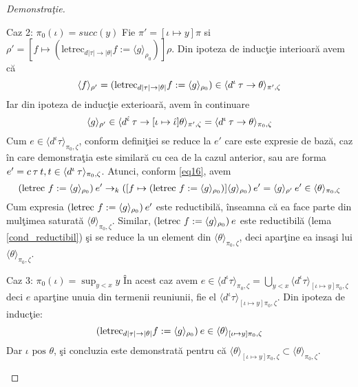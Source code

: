 \begin{proof}[Demonstra\c tie]
\begin{description}
\begin{description*}
    \item [Caz 2: $\pi_0(\iota)=succ(y)$] Fie $\pi' = [\iota \mapsto y]\pi $ si $\rho' = [f \mapsto (\text{letrec}_{d|\tau| \to |\theta|} f := \langle g \rangle_{\rho_0})] \rho$. Din ipoteza de induc\c tie interioar\u a avem c\u a
        \begin{equation}
            \langle f \rangle_{\rho'} = (\text{letrec}_{d|\tau| \to |\theta|} f := \langle g \rangle_{\rho_0}) \in \langle d^{\iota}\hspace{2pt} \tau \to \theta \rangle_{\pi',\zeta}
        \end{equation}
        Iar din ipoteza de induc\c tie exterioar\u a, avem \^ in continuare
        \begin{equation}\label{eq16}
        \langle g \rangle_{\rho'} \in \langle d^{\hat{\iota}}\hspace{2pt} \tau \to [\iota \mapsto \hat{\iota}]\theta \rangle_{\pi',\zeta} =
        \langle d^{{\iota}}\hspace{2pt} \tau \to \theta \rangle_{\pi_0,\zeta}
        \end{equation}
        Cum $e \in \langle d^{\iota} \tau \rangle_{\pi_0,\zeta}$, conform defini\c tiei se reduce la $e'$ care este expresie de baz\u a, caz \^ in care demonstra\c tia este similar\u a cu cea de la cazul anterior, sau are forma $e' = c\hspace{2pt} \tau\hspace{2pt} t , t \in \langle d^\iota\hspace{2pt} \tau \rangle_{\pi_0,\zeta}$. Atunci, conform \eqref{eq16}, avem
        $$
        (\text{letrec}\ f := \langle g \rangle_{\rho_0})\hspace{2pt} e' \to_k ([f \mapsto (\text{letrec}\ f := \langle g \rangle_{\rho_0})] \langle g \rangle_{\rho_0}) \hspace{2pt} e' = \langle g \rangle_{\rho'}\hspace{2pt} e' \in \langle \theta \rangle_{\pi_0,\zeta}
        $$
        Cum expresia $(\text{letrec}\ f := \langle g \rangle_{\rho_0})\hspace{2pt} e'$ este reductibil\u a, \^ inseamna c\u a ea face parte din mul\c timea saturat\u a $\langle \theta \rangle_{\pi_0,\zeta}$. Similar, $(\text{letrec}\ f := \langle g \rangle_{\rho_0})\hspace{2pt} e$ este reductibil\u a (lema \ref{cond_reductibil}) \c si se reduce la un element din $\langle \theta \rangle_{\pi_0,\zeta}$, deci apar\c tine ea insa\c si lui $\langle \theta \rangle_{\pi_0,\zeta}$.
    \item [Caz 3: $\pi_0(\iota)=\sup_{y<x}y$] \^ In acest caz avem $e \in \langle d^{\iota} \tau \rangle_{\pi_0,\zeta} = \bigcup _{y < x}\langle d^{\iota} \tau \rangle_{[\iota \mapsto y]\pi_0,\zeta}$ deci $e$ apar\c tine unuia din termenii reuniunii, fie el $\langle d^{\iota} \tau \rangle_{[\iota \mapsto y]\pi_0,\zeta}$. Din ipoteza de induc\c tie:
         $$
            (\text{letrec}_{d|\tau| \to |\theta|} f := \langle g \rangle_{\rho_0}) \hspace{2pt} e \in \langle \theta \rangle_{[\iota \mapsto y]\pi_0,\zeta}
         $$
        Dar $\iota \text{ pos } \theta$, \c si concluzia este demonstrat\u a pentru c\u a $\langle \theta \rangle_{[\iota \mapsto y]\pi_0,\zeta} \subset \langle \theta \rangle_{\pi_0,\zeta}$. \qedhere
    \end{description*}
\end{description}
\end{proof}

